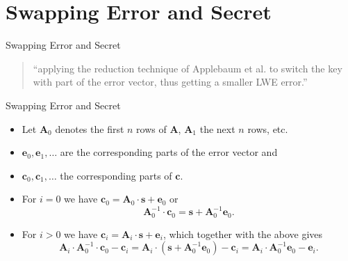 \documentclass[presentation,smaller]{beamer}
\renewcommand{\vec}[1]{\ensuremath{\mathbf{#1}}\xspace}
\begin{document}
\section{Swapping Error and Secret}
\label{sec:orgdae0cdd}
\begin{frame}[label={sec:org36f2806}]{Swapping Error and Secret}
\begin{quote}
“applying the reduction technique of Applebaum et al. to switch the key with part of the error vector, thus getting a smaller LWE error.”
\end{quote}
\end{frame}

\begin{frame}[label={sec:org4c3e6e6}]{Swapping Error and Secret}
\begin{itemize}
\item Let \(\vec{A}_0\) denotes the first \(n\) rows of \(\vec{A}\), \(\vec{A}_1\) the next \(n\) rows, etc.

\item \(\vec{e}_0, \vec{e}_1, \dots\) are the corresponding parts of the error vector and

\item \(\vec{c}_0 , \vec{c}_1, \dots\) the corresponding parts of \(\vec{c}\).

\item For \(i=0\) we have \(\vec{c}_0 = \vec{A}_0 \cdot \vec{s}  + \vec{e}_0\) or \[\vec{A}_0^{-1} \cdot \vec{c}_0 = \vec{s} + \vec{A}_0^{-1} \vec{e}_0.\]

\item For \(i > 0\) we have \(\vec{c}_i = \vec{A}_i \cdot \vec{s} + \vec{e}_i\), which together with the above gives \[\vec{A}_i ⋅ \vec{A}_0^{-1} ⋅ \vec{c}_0 - \vec{c}_i = \vec{A}_i ⋅ (\vec{s} + \vec{A}_0^{-1} \vec{e}_0) - \vec{c}_i =  \vec{A}_i ⋅ \vec{A}_0^{-1} \vec{e}_0 - \vec{e}_i.\]
\end{itemize}
\end{frame}
\end{document}
